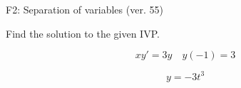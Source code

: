 \begin{exercise}
  \begin{exerciseTitle}F2: Separation of variables (ver. 55)\end{exerciseTitle}
  \begin{exerciseStatement}
    
Find the solution to the given IVP.

    
\[xy'= 3 y \hspace{1em} y( -1 ) = 3\]

  \end{exerciseStatement}
  \begin{exerciseAnswer}
    
\[y= -3 t^ 3\]

  \end{exerciseAnswer}
\end{exercise}